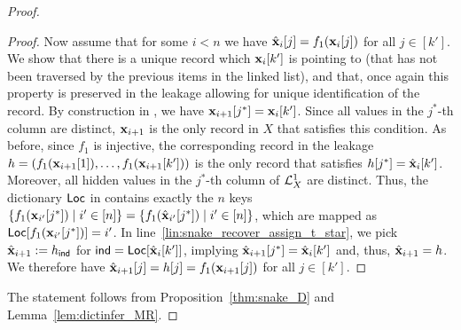 \begin{proof}
\begin{proof}
	Now assume that for some $i < n$ we have $\hat{\mathbf{x}}_i[j] = f_1(\mathbf{x}_i[j])$ for all $j \in [k']$. 
	We show that there is a unique record which $\mathbf{x}_i[k']$ is pointing to (that has not been traversed by the previous items in the linked list), 
	and that, once again this property is preserved in the leakage allowing for unique identification of the record.
	By construction in \snakeencodeUnique{}, we have $\mathbf{x}_{i+1}[j^*] = \mathbf{x}_i[k']$.
	Since all values in the $j^*$-th column are distinct, 
	$\mathbf{x}_{i+1}$ is the only record in $X$ that satisfies this condition.
	As before, since $f_1$ is injective, the corresponding record in the leakage 
	$h = (f_1(\mathbf{x}_{i+1}[1]), \dots, f_1(\mathbf{x}_{i+1}[k']))$
	is the only record that satisfies $h[j^*] = \hat{\mathbf{x}}_i[k']$.
	Moreover, all hidden values in the $j^*$-th column of $\mathcal{L}^{1}_X$	are distinct. %
	Thus, the dictionary $\mathsf{Loc}$ in \SeqToIdx{} contains exactly the $n$ keys $\{f_1(\mathbf{x}_{i'}[j^*]) \; | \; i' \in [n]\} = \{f_1(\hat{\mathbf{x}}_{i'}[j^*]) \; | \; i' \in [n]\}$,
	which are mapped as $\mathsf{Loc}[f_1(\mathbf{x}_{i'}[j^*])] = i'$.
	In line~\ref{lin:snake_recover_assign_t_star}, we pick $\hat{\mathbf{x}}_{i+1} := h_{\mathsf{ind}}$ for $\mathsf{ind} = \mathsf{Loc}[\hat{\mathbf{x}}_i[k']]$, 
	implying $\hat{\mathbf{x}}_{i+1}[j^*] = \hat{\mathbf{x}}_i[k']$ and, thus, $\hat{\mathbf{x}}_{i+1} = h$.
	We therefore have $\hat{\mathbf{x}}_{i+1}[j] = h[j] = f_1(\mathbf{x}_{i+1}[j])$ for all $j \in [k']$.
\end{proof}

	The statement follows from Proposition~\ref{thm:snake_D} and Lemma~\ref{lem:dictinfer_MR}.
\end{proof}
